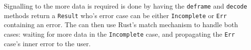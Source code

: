 Signalling to the \connection{} more data is required is done by having the \texttt{deframe} and \texttt{decode} methods
return a \texttt{Result} who's error case can be either \texttt{Incomplete} or \texttt{Err} containing an error.
The \connection{} can then use Rust's match mechanism to handle both cases: waiting for more data in the
\texttt{Incomplete} case, and propagating the \texttt{Err} case's inner error to the user.
%
%
%
%
%
%
%
%
%
%
%
%
%
%
